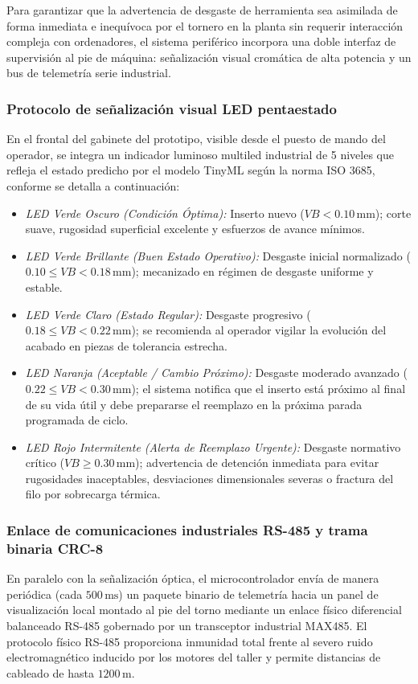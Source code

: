 Para garantizar que la advertencia de desgaste de herramienta sea asimilada de forma inmediata e inequívoca por el tornero en la planta sin requerir interacción compleja con ordenadores, el sistema periférico incorpora una doble interfaz de supervisión al pie de máquina: señalización visual cromática de alta potencia y un bus de telemetría serie industrial.

\subsubsection{Protocolo de señalización visual LED pentaestado}
En el frontal del gabinete del prototipo, visible desde el puesto de mando del operador, se integra un indicador luminoso multiled industrial de 5 niveles que refleja el estado predicho por el modelo TinyML según la norma ISO 3685, conforme se detalla a continuación:

\begin{itemize}
    \item \textit{LED Verde Oscuro (Condición Óptima):} Inserto nuevo ($VB < 0.10\,\text{mm}$); corte suave, rugosidad superficial excelente y esfuerzos de avance mínimos.
    \item \textit{LED Verde Brillante (Buen Estado Operativo):} Desgaste inicial normalizado ($0.10 \le VB < 0.18\,\text{mm}$); mecanizado en régimen de desgaste uniforme y estable.
    \item \textit{LED Verde Claro (Estado Regular):} Desgaste progresivo ($0.18 \le VB < 0.22\,\text{mm}$); se recomienda al operador vigilar la evolución del acabado en piezas de tolerancia estrecha.
    \item \textit{LED Naranja (Aceptable / Cambio Próximo):} Desgaste moderado avanzado ($0.22 \le VB < 0.30\,\text{mm}$); el sistema notifica que el inserto está próximo al final de su vida útil y debe prepararse el reemplazo en la próxima parada programada de ciclo.
    \item \textit{LED Rojo Intermitente (Alerta de Reemplazo Urgente):} Desgaste normativo crítico ($VB \ge 0.30\,\text{mm}$); advertencia de detención inmediata para evitar rugosidades inaceptables, desviaciones dimensionales severas o fractura del filo por sobrecarga térmica.
\end{itemize}

\subsubsection{Enlace de comunicaciones industriales RS-485 y trama binaria CRC-8}
En paralelo con la señalización óptica, el microcontrolador envía de manera periódica (cada $500\,\text{ms}$) un paquete binario de telemetría hacia un panel de visualización local montado al pie del torno mediante un enlace físico diferencial balanceado RS-485 gobernado por un transceptor industrial MAX485. El protocolo físico RS-485 proporciona inmunidad total frente al severo ruido electromagnético inducido por los motores del taller y permite distancias de cableado de hasta $1200\,\text{m}$.

